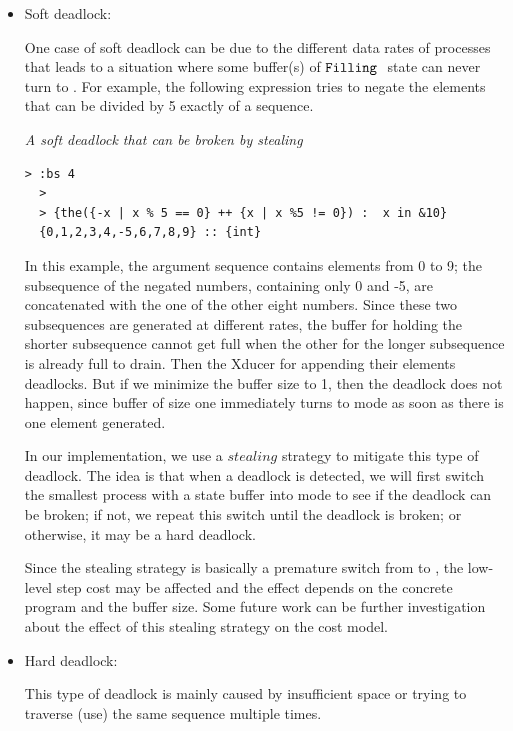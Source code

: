 \begin{itemize}

\item Soft deadlock: 

One case of soft deadlock can be due to the different data rates of processes that leads to a situation where some buffer(s) of $\texttt{Filling} \ $ state can never turn to \draining. 
For example, the following expression tries to negate the elements that can be divided by 5 exactly of a sequence.
\begin{example}\emph{ A soft deadlock that can be broken by stealing}
\end{example}
\begin{lstlisting}[style=nesl-style]
  > :bs 4
  >
  > {the({-x | x % 5 == 0} ++ {x | x %5 != 0}) :  x in &10}
  {0,1,2,3,4,-5,6,7,8,9} :: {int}
\end{lstlisting}


In this example, the argument sequence contains elements from 0 to 9; the subsequence of the negated numbers, containing only 0 and -5, are concatenated with the one of the other eight numbers. 
Since these two subsequences are generated at different rates,
the buffer for holding the shorter subsequence cannot get full when the other for the longer subsequence is already full to drain.
Then the Xducer for appending their elements deadlocks.
But if we minimize the buffer size to 1, then the deadlock does not happen, since buffer of size one immediately turns to \draining mode as soon as there is one element generated. 

In our implementation, we use a $stealing$ strategy to mitigate this type of deadlock. 
The idea is that when a deadlock is detected, we will first switch the smallest process with a \filling state buffer into \draining mode to see if the deadlock can be broken; if not, we repeat this switch until the deadlock is broken; or otherwise, it may be a hard deadlock.

Since the stealing strategy is basically a premature
switch from \filling to \draining, the low-level step cost may be affected and the effect depends on the concrete program and the buffer size. 
Some future work can be further investigation about the effect of this stealing strategy on the cost model.\\


\item Hard deadlock: 

This type of deadlock is mainly caused by insufficient space or trying to traverse (use) the same sequence multiple times. 


\end{itemize}
